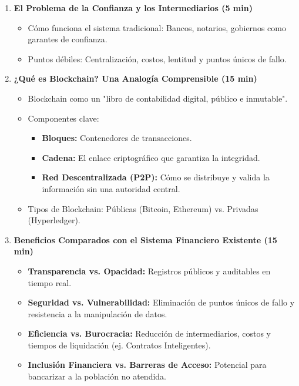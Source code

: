 \documentclass[12pt,a4paper]{article}
\begin{document}
\begin{enumerate}
    \item \textbf{El Problema de la Confianza y los Intermediarios (5 min)}
    \begin{itemize}
        \item Cómo funciona el sistema tradicional: Bancos, notarios, gobiernos como garantes de confianza.
        \item Puntos débiles: Centralización, costos, lentitud y puntos únicos de fallo.
    \end{itemize}
    
    \item \textbf{¿Qué es Blockchain? Una Analogía Comprensible (15 min)}
    \begin{itemize}
        \item Blockchain como un "libro de contabilidad digital, público e inmutable".
        \item Componentes clave:
        \begin{itemize}
            \item \textbf{Bloques:} Contenedores de transacciones.
            \item \textbf{Cadena:} El enlace criptográfico que garantiza la integridad.
            \item \textbf{Red Descentralizada (P2P):} Cómo se distribuye y valida la información sin una autoridad central.
        \end{itemize}
        \item Tipos de Blockchain: Públicas (Bitcoin, Ethereum) vs. Privadas (Hyperledger).
    \end{itemize}
    
    \item \textbf{Beneficios Comparados con el Sistema Financiero Existente (15 min)}
    \begin{itemize}
        \item \textbf{Transparencia vs. Opacidad:} Registros públicos y auditables en tiempo real.
        \item \textbf{Seguridad vs. Vulnerabilidad:} Eliminación de puntos únicos de fallo y resistencia a la manipulación de datos.
        \item \textbf{Eficiencia vs. Burocracia:} Reducción de intermediarios, costos y tiempos de liquidación (ej. Contratos Inteligentes).
        \item \textbf{Inclusión Financiera vs. Barreras de Acceso:} Potencial para bancarizar a la población no atendida.
    \end{itemize}
    

\end{enumerate}
\end{document}
